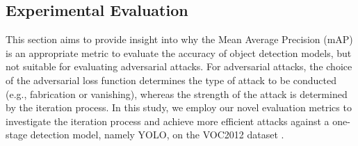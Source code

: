 






\subsection{Experimental Evaluation}

This section aims to provide insight into why the Mean Average Precision (mAP) is an appropriate metric to evaluate the accuracy of object detection models, but not suitable for evaluating adversarial attacks. For adversarial attacks, the choice of the adversarial loss function determines the type of attack to be conducted (e.g., fabrication or vanishing), whereas the strength of the attack is determined by the iteration process. In this study, we employ our novel evaluation metrics to investigate the iteration process and achieve more efficient attacks against a one-stage detection model, namely YOLO, on the VOC2012 dataset \cite{pascal-voc-2012}.

